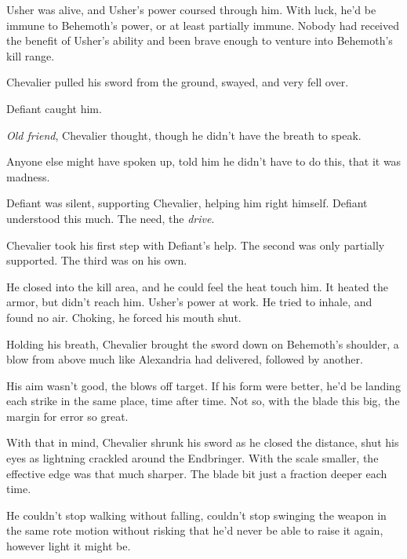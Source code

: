 Usher was alive, and Usher's power coursed through him.  With luck, he'd be immune to Behemoth's power, or at least partially immune.  Nobody had received the benefit of Usher's ability and been brave enough to venture into Behemoth's kill range.



Chevalier pulled his sword from the ground, swayed, and very fell over.



Defiant caught him.



\emph{Old friend}, Chevalier thought, though he didn't have the breath to speak.



Anyone else might have spoken up, told him he didn't have to do this, that it was madness.



Defiant was silent, supporting Chevalier, helping him right himself.  Defiant understood this much.  The need, the \emph{drive}.



Chevalier took his first step with Defiant's help.  The second was only partially supported.  The third was on his own.



He closed into the kill area, and he could feel the heat touch him.  It heated the armor, but didn't reach him.  Usher's power at work.  He tried to inhale, and found no air.  Choking, he forced his mouth shut.



Holding his breath, Chevalier brought the sword down on Behemoth's shoulder, a blow from above much like Alexandria had delivered, followed by another.



His aim wasn't good, the blows off target.  If his form were better, he'd be landing each strike in the same place, time after time.  Not so, with the blade this big, the margin for error so great.



With that in mind, Chevalier shrunk his sword as he closed the distance, shut his eyes as lightning crackled around the Endbringer.  With the scale smaller, the effective edge was that much sharper.  The blade bit just a fraction deeper each time.



He couldn't stop walking without falling, couldn't stop swinging the weapon in the same rote motion without risking that he'd never be able to raise it again, however light it might be.



